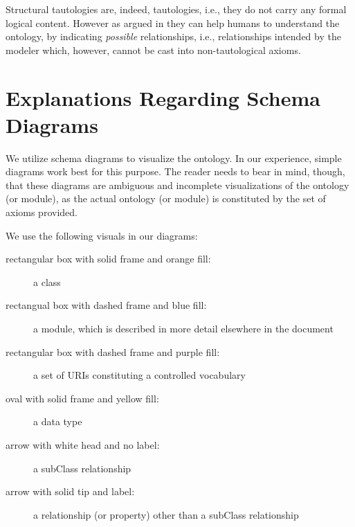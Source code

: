 Structural tautologies are, indeed, tautologies, i.e., they do not carry any formal logical content. However as argued in \cite{HitzlerK16} they can help humans to understand the ontology, by indicating \emph{possible} relationships, i.e., relationships intended by the modeler which, however, cannot be cast into non-tautological axioms.

\section*{Explanations Regarding Schema Diagrams}

We utilize schema diagrams to visualize the ontology. In our experience, simple diagrams work best for this purpose. The reader needs to bear in mind, though, that these diagrams are ambiguous and incomplete visualizations of the ontology (or module), as the actual ontology (or module) is constituted by the set of axioms provided. 

We use the following visuals in our diagrams:

\begin{description}
\item[rectangular box with solid frame and orange fill:] a class
\item[rectangual box with dashed frame and blue fill:] a module, which is described in more detail elsewhere in the document
\item[rectangular box with dashed frame and purple fill:] a set of URIs constituting a controlled vocabulary
\item[oval with solid frame and yellow fill:] a data type
\item[arrow with white head and no label:] a subClass relationship
\item[arrow with solid tip and label:] a relationship (or property) other than a subClass relationship
\end{description}